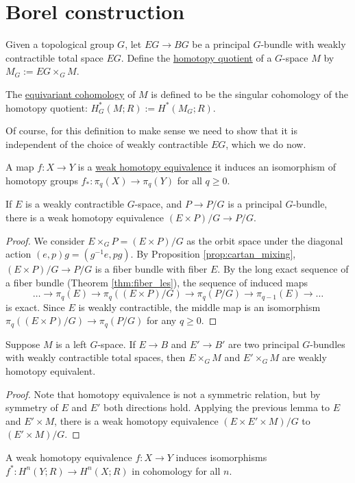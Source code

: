 \section{Borel construction}
\begin{defn}
	Given a topological group $G$, let  $EG \to BG$ be a principal  $G$-bundle
	with weakly contractible total space  $EG$. Define the  \underline{homotopy
	quotient} of a $G$-space $M$ by $M_G:=EG\times_G M$.
	 
	The \underline{equivariant cohomology} of $M$ is defined to be the singular
	cohomology of the homotopy quotient: $H_G^*(M;R) := H^*(M_G;R)$.
\end{defn}
Of course, for this definition to make sense we need to show that it is
independent of the choice of weakly contractible $EG$, which we do now. 

\begin{defn}
	A map $f:X\to Y$ is a \underline{weak homotopy equivalence}
	it induces an isomorphism of homotopy groups
	$f_*:\pi_q(X)\to\pi_q(Y)$ for all  $q\geq 0$. 
\end{defn}

\begin{lem} %
	If $E$ is a weakly contractible $G$-space, and $P\to P/G$ is a principal
	$G$-bundle, there is a weak homotopy equivalence $(E\times P) /G \to P /G$.  
\end{lem}
\begin{proof}
	We consider $E\times_G P = (E\times P) /G$ as the orbit space under 
	the diagonal action $(e,p)g = (g^{-1}e,pg)$. 
	By Proposition \ref{prop:cartan_mixing}, $(E\times P) /G \to P /G$ is a
	fiber bundle with fiber $E$. By the long exact sequence of a fiber
	bundle (Theorem \ref{thm:fiber_les}), the sequence of induced maps
	\[
	\ldots \to \pi_q(E) \to \pi_q((E\times P) /G) \to\pi_q(P /G) \to
	\pi_{q-1}(E)\to \ldots
	\] 
	is exact. Since $E$ is weakly contractible, the middle map is an isomorphism
	 $\pi_q((E\times P) /G) \to \pi_q(P /G)$ for any  $q\geq 0$.
\end{proof}

\begin{cor}
	Suppose $M$ is a left  $G$-space. If $E\to B$ and  $E'\to B'$ are two principal
	$G$-bundles with weakly contractible total spaces, then $E\times_G M$ and
	$E'\times_G M$ are weakly homotopy equivalent.
\end{cor}
\begin{proof}
	Note that homotopy equivalence is not a symmetric relation, but by symmetry
	of $E$ and  $E'$ both directions hold. 
	Applying the previous lemma to $E$ and $E'\times M$, there is a weak
	homotopy equivalence $(E\times E'\times M)/G$ to $(E'\times M) /G$.

\end{proof}
\begin{thm}
	A weak homotopy equivalence $f:X\to Y$ induces isomorphisms
	$f^*:H^n(Y;R)\to H^n(X;R)$ in cohomology for all  $n$.
\end{thm}

